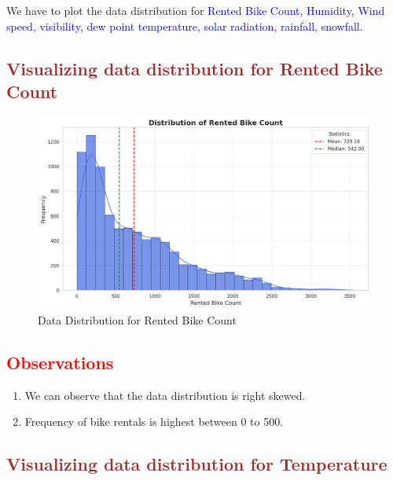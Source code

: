 \documentclass[12pt, letterpaper]{article}
\begin{document}
We have to plot the data distribution for \textcolor{blue}{Rented Bike Count, Humidity, Wind speed, visibility, dew point temperature, solar radiation, rainfall, snowfall.}

\newpage

\subsection*{\textcolor{brown}{Visualizing data distribution for Rented Bike Count}}

\begin{figure}[h]
  \centering
  \includegraphics[width=1\textwidth]{bikerented.png}
  \caption{Data Distribution for Rented Bike Count}
\end{figure}

\subsection*{\textcolor{red}{Observations}}
\begin{enumerate}
  \item We can observe that the data distribution is right skewed.
  \item Frequency of bike rentals is highest between 0 to 500.
\end{enumerate}

\newpage

\subsection*{\textcolor{brown}{Visualizing data distribution for Temperature}}
\end{document}
